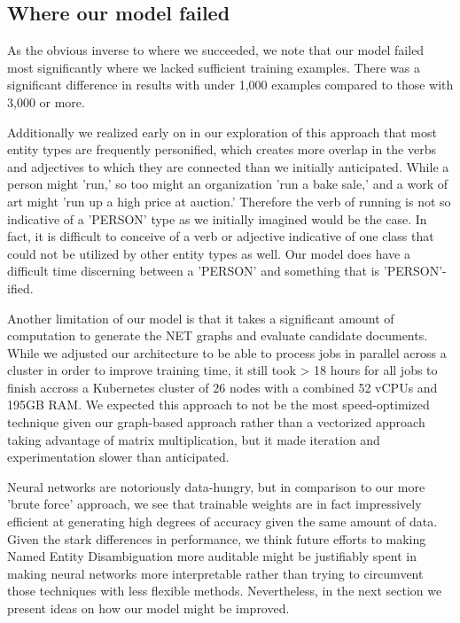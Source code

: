 \documentclass[11pt,a4paper]{article}
\begin{document}
\subsection{Where our model failed}

As the obvious inverse to where we succeeded, we note that our model failed most significantly where we lacked sufficient training examples. There was a significant difference in results with under 1,000 examples compared to those with 3,000 or more.

Additionally we realized early on in our exploration of this approach that most entity types are frequently personified, which creates more overlap in the verbs and adjectives to which they are connected than we initially anticipated. While a person might 'run,' so too might an organization 'run a bake sale,' and a work of art might 'run up a high price at auction.' Therefore the verb of running is not so indicative of a 'PERSON' type as we initially imagined would be the case. In fact, it is difficult to conceive of a verb or adjective indicative of one class that could not be utilized by other entity types as well. Our model does have a difficult time discerning between a 'PERSON' and something that is 'PERSON'-ified.

Another limitation of our model is that it takes a significant amount of computation to generate the NET graphs and evaluate candidate documents. While we adjusted our architecture to be able to process jobs in parallel across a cluster in order to improve training time, it still took > 18 hours for all jobs to finish accross a Kubernetes cluster of 26 nodes with a combined 52 vCPUs and 195GB RAM. We expected this approach to not be the most speed-optimized technique given our graph-based approach rather than a vectorized approach taking advantage of matrix multiplication, but it made iteration and experimentation slower than anticipated.

Neural networks are notoriously data-hungry, but in comparison to our more 'brute force' approach, we see that trainable weights are in fact impressively efficient at generating high degrees of accuracy given the same amount of data. Given the stark differences in performance, we think future efforts to making Named Entity Disambiguation more auditable might be justifiably spent in making neural networks more interpretable rather than trying to circumvent those techniques with less flexible methods. Nevertheless, in the next section we present ideas on how our model might be improved.
\end{document}
